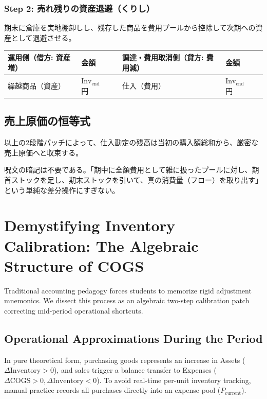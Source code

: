 \subsection{Step 2: 売れ残りの資産退避（くりし）}
期末に倉庫を実地棚卸しし、残存した商品を費用プールから控除して次期への資産として退避させる。
\begin{table}[htbp]
\centering
\begin{tabular}{llrllr}
\toprule
\textbf{運用側（借方: 資産増）} & 金額 & \quad & \textbf{調達・費用取消側（貸方: 費用減）} & 金額 \\
\midrule
繰越商品（資産） & $\text{Inv}_{\text{end}}$ 円 & & 仕入（費用） & $\text{Inv}_{\text{end}}$ 円 \\
\bottomrule
\end{tabular}
\end{table}

\section{売上原価の恒等式}
以上の2段階パッチによって、仕入勘定の残高は当初の購入額総和から、厳密な売上原価へと収束する。

呪文の暗記は不要である。「期中に全額費用として雑に扱ったプールに対し、期首ストックを足し、期末ストックを引いて、真の消費量（フロー）を取り出す」という単純な差分操作にすぎない。

\else
\chapter{Demystifying Inventory Calibration: The Algebraic Structure of COGS}
\label{chap:cost_of_goods_sold}

Traditional accounting pedagogy forces students to memorize rigid adjustment mnemonics. We dissect this process as an algebraic two-step calibration patch correcting mid-period operational shortcuts.

\section{Operational Approximations During the Period}
In pure theoretical form, purchasing goods represents an increase in Assets ($\Delta \text{Inventory} > 0$), and sales trigger a balance transfer to Expenses ($\Delta \text{COGS} > 0, \Delta \text{Inventory} < 0$). To avoid real-time per-unit inventory tracking, manual practice records all purchases directly into an expense pool ($P_{\text{current}}$).

